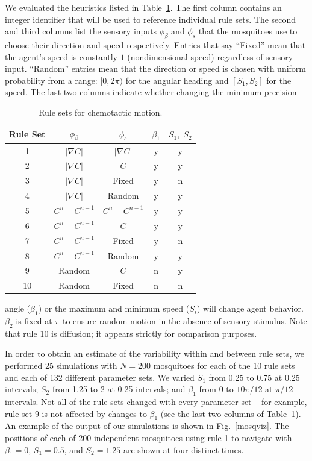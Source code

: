 \documentclass[12pt]{article}
\begin{document}
	We evaluated the heuristics listed in Table~\ref{rulesets}. The first column contains an integer identifier that will be used to reference individual rule sets. The second and third columns list the sensory inputs $\phi_\beta$ and $\phi_s$ that the mosquitoes use to choose their direction and speed respectively. Entries that say ``Fixed'' mean that the agent's speed is constantly $1$ (nondimensional speed) regardless of sensory input. ``Random'' entries mean that the direction or speed is chosen with uniform probability from a range: $[0,2\pi)$ for the angular heading and $[S_1,S_2]$ for the speed. The last two columns indicate whether changing the minimum precision 
	\begin{table}[hb]
		\centering
	\begin{tabular}{|c|c|c|c|c|}
		\hline
		Rule Set &  $\phi_\beta$ & $\phi_s$ & $\beta_1$ & $S_1,\;S_2$ \\
		\hline
		 1 & $\lvert \nabla C \rvert$ & $\lvert \nabla C \rvert$ & y & y \\
		 2 & $\lvert \nabla C \rvert$ & $ C$ & y & y \\
		 3 & $\lvert \nabla C \rvert$ & Fixed & y & n \\
		 4 & $\lvert \nabla C \rvert$ & Random & y & y \\
		 5 &  $C^n - C^{n-1}$ & $C^n - C^{n-1}$ & y & y \\
		 6 &  $C^n - C^{n-1}$ & $ C $ & y & y \\
		 7 &  $C^n - C^{n-1}$ & Fixed & y & n \\
		 8 &  $C^n - C^{n-1}$ & Random & y & y \\
		 9 & Random & $ C $ & n & y\\
		 10 & Random & Fixed & n & n\\
	\hline                                                  
	\end{tabular}
	\caption{Rule sets for chemotactic motion.}
	\label{rulesets}
	\end{table}
	angle ($\beta_1$) or the maximum and minimum speed ($S_i$) will change agent behavior. $\beta_2$ is fixed at $\pi$ to ensure random motion in the absence of sensory stimulus. Note that rule 10 is diffusion; it appears strictly for comparison purposes.
	

	In order to obtain an estimate of the variability within and between rule sets, we performed 25 simulations with $N = 200$ mosquitoes for each of the 10 rule sets and each of 132 different parameter sets. We varied $S_1$ from 0.25 to 0.75 at 0.25 intervals; $S_2$ from 1.25 to 2 at 0.25 intervals; and $\beta_1$ from $0$ to $10\pi/12$ at $\pi/12$ intervals. Not all of the rule sets changed with every parameter set -- for example, rule set 9 is not affected by changes to $\beta_1$ (see the last two columns of Table~\ref{rulesets}). An example of the output of our simulations is shown in Fig.~\ref{mosqviz}. The positions of each of 200 independent mosquitoes using rule 1 to navigate with $\beta_1 = 0$, $S_1 = 0.5$, and $S_2 = 1.25$ are shown at four distinct times. 
\end{document}
